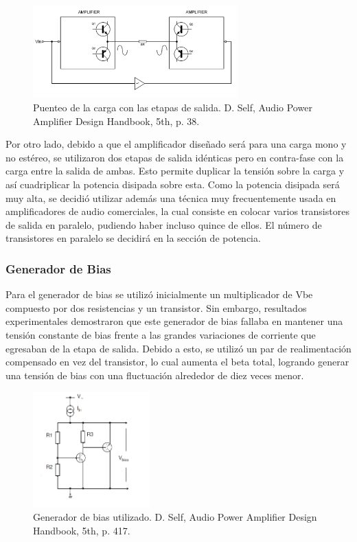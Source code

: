 \begin{figure}[H]
\centering
	\includegraphics[width=0.7\textwidth]{ImagenesOutput-Stage/pag38-bridge_2.png}
	\caption{Puenteo de la carga con las etapas de salida. D. Self, Audio Power Amplifier Design Handbook, 5th, p. 38.}
	\label{fig:bridge}
\end{figure}

Por otro lado, debido a que el amplificador diseñado será para una carga mono y no estéreo, se utilizaron dos etapas de salida idénticas pero en contra-fase con la carga entre la salida de ambas. Esto permite duplicar la tensión sobre la carga y así cuadriplicar la potencia disipada sobre esta.
Como la potencia disipada será muy alta, se decidió utilizar además una técnica muy frecuentemente usada en amplificadores de audio comerciales, la cual consiste en colocar varios transistores de salida en paralelo, pudiendo haber incluso quince de ellos. El número de transistores en paralelo se decidirá en la sección de potencia.





\subsubsection{Generador de Bias}

Para el generador de bias se utilizó inicialmente un multiplicador de Vbe compuesto por dos resistencias y un transistor. Sin embargo, resultados experimentales demostraron que este generador de bias fallaba en mantener una tensión constante de bias frente a las grandes variaciones de corriente que egresaban de la etapa de salida. Debido a esto, se utilizó un par de realimentación compensado en vez del transistor, lo cual aumenta el beta total, logrando generar una tensión de bias con una fluctuación alrededor de diez veces menor.

\begin{figure}[H]
\centering
	\includegraphics[width=0.4\textwidth]{ImagenesOutput-Stage/pag417-bias.png}
	\caption{Generador de bias utilizado. D. Self, Audio Power Amplifier Design Handbook, 5th, p. 417.}
	\label{fig:bias}
\end{figure}

